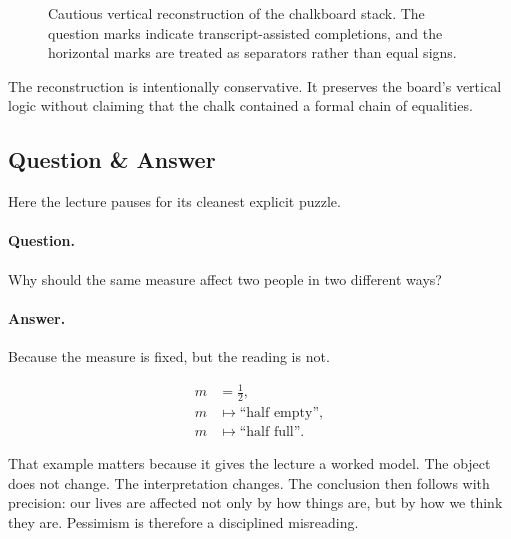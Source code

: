 \begin{figure}[h]
\centering
{}
\caption{Cautious vertical reconstruction of the chalkboard stack. The question marks indicate transcript-assisted completions, and the horizontal marks are treated as separators rather than equal signs.}
\end{figure}

\begin{remark}
The reconstruction is intentionally conservative. It preserves the board's vertical logic without claiming that the chalk contained a formal chain of equalities.
\end{remark}

\subsection{Question \& Answer}

Here the lecture pauses for its cleanest explicit puzzle.

\paragraph{Question.} Why should the same measure affect two people in two different ways?

\paragraph{Answer.} Because the measure is fixed, but the reading is not.

\begin{align}
m &= \tfrac12,\\
m &\mapsto \text{``half empty''},\\
m &\mapsto \text{``half full''}.
\end{align}

That example matters because it gives the lecture a worked model. The object does not change. The interpretation changes. The conclusion then follows with precision: our lives are affected not only by how things are, but by how we think they are. Pessimism is therefore a disciplined misreading.

